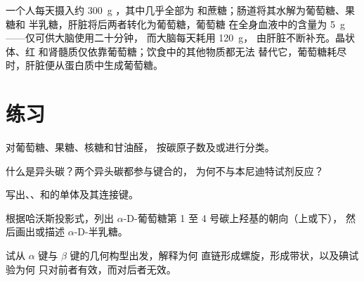 \begin{example}[一天的糖]\label{ex:b1:carbohydrates:day}
一个人每天摄入约 \qty{300}{g} ，其中几乎全部为
和蔗糖；肠道将其水解为葡萄糖、果糖和
半乳糖，肝脏将后两者转化为葡萄糖，葡萄糖
在全身血液中的含量为 \qty{5}{g}——仅可供大脑使用二十分钟，
而大脑每天耗用 \qty{120}{g}，
由肝脏不断补充。晶状体、红
和肾髓质仅依靠葡萄糖；饮食中的其他物质都无法
替代它，葡萄糖耗尽时，肝脏便从蛋白质中生成葡萄糖。
\end{example}

\section{练习}

\begin{exercise}[$\star$]\label{exo:b1:carbohydrates:1}
对葡萄糖、果糖、核糖和甘油醛，
按碳原子数及或进行分类。
\end{exercise}

\begin{exercise}[$\star$]\label{exo:b1:carbohydrates:2}
什么是异头碳？两个异头碳都参与键合的，
为何不与本尼迪特试剂反应？
\end{exercise}

\begin{exercise}[$\star$]\label{exo:b1:carbohydrates:3}
写出、、和的单体及其连接键。
\end{exercise}

\begin{exercise}[$\star$]\label{exo:b1:carbohydrates:4}
根据哈沃斯投影式，列出
$\alpha$-D-葡萄糖第 1 至 4 号碳上羟基的朝向（上或下），
然后画出或描述 $\alpha$-D-半乳糖。
\end{exercise}

\begin{exercise}[$\star\star$]\label{exo:b1:carbohydrates:5}
试从 $\alpha$ 键与 $\beta$ 键的几何构型出发，解释为何
直链形成螺旋，形成带状，以及碘试验为何
只对前者有效，而对后者无效。
\end{exercise}


